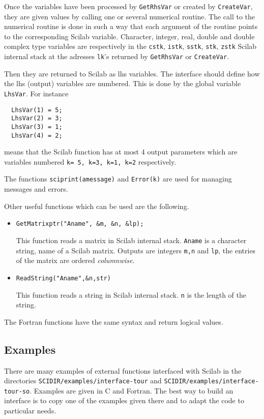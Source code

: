 Once the  variables have been processed by {\tt GetRhsVar} or created
by {\tt CreateVar}, they are given values by calling one or several 
numerical routine. The call to the numerical routine is done
in such a way that each argument of the routine points to the
corresponding Scilab variable. 
Character, integer, real, double and double complex type variables are 
respectively in the {\tt cstk}, {\tt istk}, {\tt sstk}, 
{\tt stk}, {\tt zstk} Scilab internal stack
at the adresses {\tt lk}'s returned by {\tt GetRhsVar} or {\tt CreateVar}. 

Then they are returned to Scilab as lhs variables.
The interface should define how the lhs (output) variables are
numbered. This is done by the global variable {\tt LhsVar}.
For instance
\begin{verbatim}
  LhsVar(1) = 5;
  LhsVar(2) = 3;
  LhsVar(3) = 1;
  LhsVar(4) = 2;
\end{verbatim}
means that the Scilab function has at most 4 output parameters
which are variables numbered \verb!k= 5, k=3, k=1, k=2! respectively.

The functions \verb!sciprint(amessage)! and \verb!Error(k)! are used
for managing messages and errors.

Other useful functions which can be used are the following.
\begin{itemize}
\item{
\begin{verbatim}
GetMatrixptr("Aname", &m, &n, &lp);
\end{verbatim}
This function reads a matrix in Scilab internal stack. \verb!Aname! is
a character string, name of a Scilab matrix. Outputs are integers
\verb!m,n! and \verb!lp!, the entries of the matrix are 
ordered {\em columnwise}.}
\item{
\begin{verbatim}
ReadString("Aname",&n,str)
\end{verbatim}
This function reads a string in Scilab internal stack. \verb!n! is the
length of the string.
}
\end{itemize}


The Fortran functions have the same syntax and return logical values.
\subsection{Examples}
There are many examples of external functions interfaced with Scilab in
the directories \verb!SCIDIR/examples/interface-tour! and \newline
\verb!SCIDIR/examples/interface-tour-so!. 
Examples are given in C and Fortran. 
The best way to build an interface is to copy one of the examples
given there and to adapt the code to particular needs.


